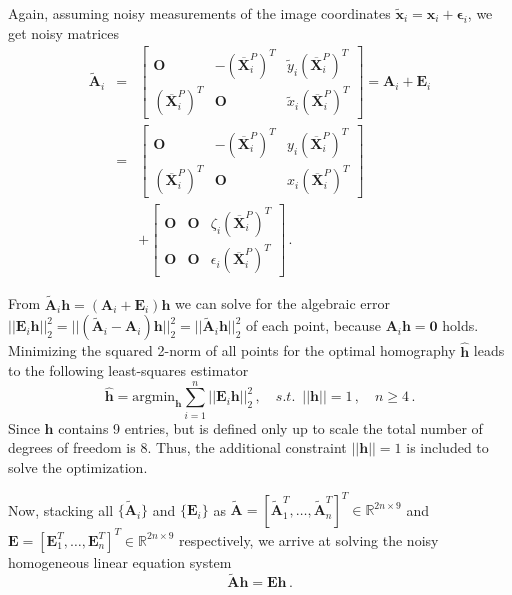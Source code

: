 \documentclass[letterpaper, 10 pt, conference]{ieeeconf}  %
\begin{document}
	Again, assuming noisy measurements of the image coordinates
	$\tilde{\mathbf{x}}_i = \mathbf{x}_i + \bm{\epsilon}_i$, we get noisy matrices
	\begin{eqnarray}
	\tilde{\mathbf{A}}_i & = &
	\begin{bmatrix}
	\mathbf{O} & -(\overline{\mathbf{X}}_i^P)^T & \tilde{y}_i(\overline{\mathbf{X}}_i^P)^T \\
	(\overline{\mathbf{X}}_i^P)^T & \mathbf{O} & \tilde{x}_i(\overline{\mathbf{X}}_i^P)^T 
	\end{bmatrix} = 
	\mathbf{A}_i + \mathbf{E}_i \\
	& = &
	\begin{bmatrix}
	\mathbf{O} & -(\overline{\mathbf{X}}_i^P)^T & y_i(\overline{\mathbf{X}}_i^P)^T \\
	(\overline{\mathbf{X}}_i^P)^T & \mathbf{O} & x_i(\overline{\mathbf{X}}_i^P)^T 
	\end{bmatrix} \nonumber \\
	& & +
	\begin{bmatrix}
	\mathbf{O} & \mathbf{O} & \zeta_i(\overline{\mathbf{X}}_i^P)^T \\
	\mathbf{O} & \mathbf{O} & \epsilon_i(\overline{\mathbf{X}}_i^P)^T 
	\end{bmatrix}\,.
	\end{eqnarray}
	
	From $\tilde{\mathbf{A}}_i\mathbf{h} = (\mathbf{A}_i + \mathbf{E}_i)\mathbf{h}$
	we can solve for the algebraic error
	$|\!|\mathbf{E}_i\mathbf{h}|\!|_2^2 = |\!|(\tilde{\mathbf{A}}_i-\mathbf{A}_i)\mathbf{h} |\!|_2^2= |\!|\tilde{\mathbf{A}}_i\mathbf{h}|\!|_2^2$ of each point, because $\mathbf{A}_i\mathbf{h} = \mathbf{0}$ holds.
	Minimizing the squared 2-norm of all points for the optimal homography $\hat{\mathbf{h}}$ 
	leads to the following least-squares estimator
	\begin{equation}
	\label{Eq5}
	\hat{\mathbf{h}} = \text{argmin}_{\mathbf{h}} 
	\sum\limits_{i=1}^n |\!|\mathbf{E}_i\mathbf{h}|\!|_2^2\, , \quad s.t. \,\,\, |\!|\mathbf{h}|\!|=1\,,\quad n \geq 4 \,.
	\end{equation} 
	Since $\mathbf{h}$ contains 9 entries, but is defined only up to scale the total number of degrees of freedom is 8. Thus, the additional constraint $|\!|\mathbf{h}|\!|=1$ is included to solve the optimization.
	
	Now, stacking all $\{\tilde{\mathbf{A}}_i\}$ and $\{\mathbf{E}_i\}$ as $\tilde{\mathbf{A}}=[\tilde{\mathbf{A}}_1^T, \dots, \tilde{\mathbf{A}}_n^T]^T \in \mathbb{R}^{2n \times 9}$
	and $\mathbf{E}=[\mathbf{E}_1^T, \dots, \mathbf{E}_n^T]^T \in \mathbb{R}^{2n \times 9}$ respectively, we arrive at solving
	the noisy homogeneous linear equation system
	\begin{equation}
	\label{Eq6}
	\tilde{\mathbf{A}}\mathbf{h}=\mathbf{E}\mathbf{h} \,.
	\end{equation}
	
\end{document}
